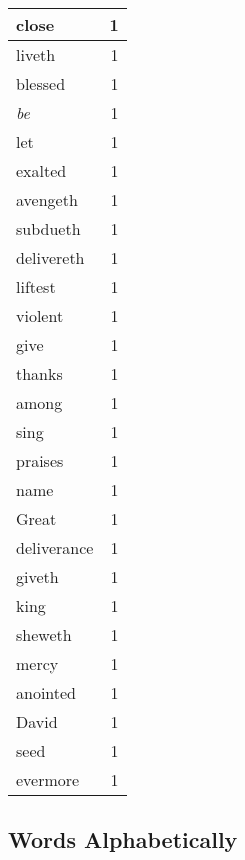 \begin{center}
\begin{longtable}{l|r}
close & 1 \\ \hline
liveth & 1 \\ \hline
blessed & 1 \\ \hline
\emph{be} & 1 \\ \hline
let & 1 \\ \hline
exalted & 1 \\ \hline
avengeth & 1 \\ \hline
subdueth & 1 \\ \hline
delivereth & 1 \\ \hline
liftest & 1 \\ \hline
violent & 1 \\ \hline
give & 1 \\ \hline
thanks & 1 \\ \hline
among & 1 \\ \hline
sing & 1 \\ \hline
praises & 1 \\ \hline
name & 1 \\ \hline
Great & 1 \\ \hline
deliverance & 1 \\ \hline
giveth & 1 \\ \hline
king & 1 \\ \hline
sheweth & 1 \\ \hline
mercy & 1 \\ \hline
anointed & 1 \\ \hline
David & 1 \\ \hline
seed & 1 \\ \hline
evermore & 1 \\ \hline
\end{longtable}
\end{center}



\normalsize



\subsection{Words Alphabetically}

